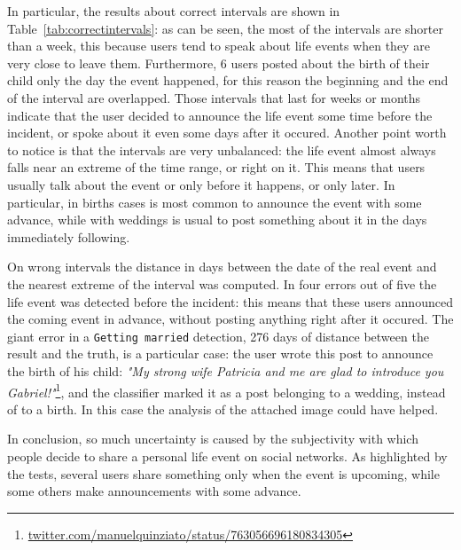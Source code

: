 In particular, the results about correct intervals are shown in Table~\ref{tab:correctintervals}: as can be seen, the most of the intervals are shorter than a week, this because users tend to speak about life events when they are very close to leave them. Furthermore, 6 users posted about the birth of their child only the day the event happened, for this reason the beginning and the end of the interval are overlapped. Those intervals that last for weeks or months indicate that the user decided to announce the life event some time before the incident, or spoke about it even some days after it occured. Another point worth to notice is that the intervals are very unbalanced: the life event almost always falls near an extreme of the time range, or right on it. This means that users usually talk about the event or only before it happens, or only later. In particular, in births cases is most common to announce the event with some advance, while with weddings is usual to post something about it in the days immediately following.

On wrong intervals the distance in days between the date of the real event and the nearest extreme of the interval was computed. In four errors out of five the life event was detected before the incident: this means that these users announced the coming event in advance, without posting anything right after it occured. The giant error in a \texttt{Getting married} detection, 276 days of distance between the result and the truth, is a particular case: the user wrote this post to announce the birth of his child: \textit{"My strong wife Patricia and me are glad to introduce you Gabriel!"}\footnote{\url{twitter.com/manuelquinziato/status/763056696180834305}}, and the classifier marked it as a post belonging to a wedding, instead of to a birth. In this case the analysis of the attached image could have helped.

In conclusion, so much uncertainty is caused by the subjectivity with which people decide to share a personal life event on social networks. As highlighted by the tests, several users share something only when the event is upcoming, while some others make announcements with some advance. 

